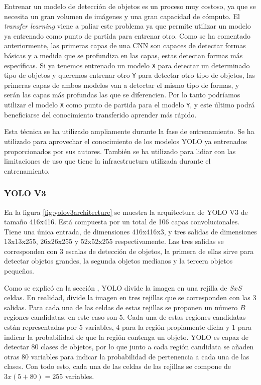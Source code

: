 
Entrenar un modelo de detección de objetos es un proceso muy costoso, ya que se necesita un gran volumen de imágenes y una gran capacidad de cómputo. El \textit{transfer learning} viene a paliar este problema ya que permite utilizar un modelo ya entrenado como punto de partida para entrenar otro. Como se ha comentado anteriormente, las primeras capas de una CNN son capaces de detectar formas básicas y a medida que se profundiza en las capas, estas detectan formas más específicas. Si ya tenemos entrenado un modelo \texttt{X} para detectar un determinado tipo de objetos y queremos entrenar otro \texttt{Y} para detectar otro tipo de objetos, las primeras capas de ambos modelos van a detectar el mismo tipo de formas, y serán las capas más profundas las que se diferencien. Por lo tanto podríamos utilizar el modelo \texttt{X} como punto de partida para el modelo \texttt{Y}, y este último podrá beneficiarse del conocimiento transferido aprender más rápido.

Esta técnica se ha utilizado ampliamente durante la fase de entrenamiento. Se ha utilizado para aprovechar el conocimiento de los modelos YOLO ya entrenados proporcionados por sus autores. También se ha utilizado para lidiar con las limitaciones de uso que tiene la infraestructura utilizada durante el entrenamiento.

\subsubsection*{YOLO V3}

En la figura \ref{fig:yolov3architecture} se muestra la arquitectura de YOLO V3 de tamaño 416x416. Está compuesta por un total de 106 capas convolucionales. Tiene una única entrada, de dimensiones 416x416x3, y tres salidas de dimensiones 13x13x255, 26x26x255 y 52x52x255 respectivamente. Las tres salidas se corresponden con 3 escalas de detección de objetos, la primera de ellas sirve para detectar objetos grandes, la segunda objetos medianos y la tercera objetos pequeños.

Como se explicó en la sección \textit{}, YOLO divide la imagen en una rejilla de $SxS$ celdas. En realidad, divide la imagen en tres rejillas que se corresponden con las 3 salidas. Para cada una de las celdas de estas rejillas se proponen un número $B$ regiones candidatas, en este caso son 5. Cada una de estas regiones candidatas están representadas por 5 variables, 4 para la región propiamente dicha y 1 para indicar la probabilidad de que la región contenga un objeto. YOLO es capaz de detectar 80 clases de objetos, por lo que junto a cada región candidata se añaden otras 80 variables para indicar la probabilidad de pertenencia a cada una de las clases. Con todo esto, cada una de las celdas de las rejillas se compone de $3 x (5 + 80) = 255$ variables.


